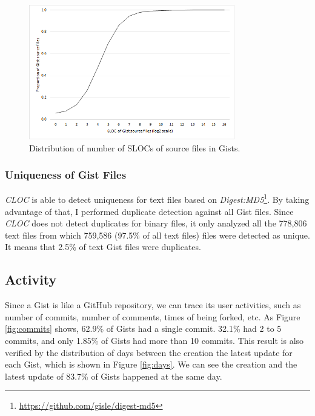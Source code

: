 \begin{figure}[!htb]
	\centering
	\includegraphics[width=0.8\textwidth]{figures/sloc.png}
	\caption{Distribution of number of SLOCs of source files in Gists.}
	\label{fig:sloc}
\end{figure}

\subsubsection{Uniqueness of Gist Files}
\textit{CLOC} is able to detect uniqueness for text files based on \textit{Digest:MD5}\footnote{\url{https://github.com/gisle/digest-md5}}. By taking advantage of that, I performed duplicate detection against all Gist files. Since \textit{CLOC} does not detect duplicates for binary files, it only analyzed all the 778,806 text files from which 759,586 (97.5\% of all text files) files were detected as unique. It means that 2.5\% of text Gist files were duplicates.

\subsection{Activity}
Since a Gist is like a GitHub repository, we can trace its user activities, such as number of commits, number of comments, times of being forked, etc. As Figure \ref{fig:commits} shows, 62.9\% of Gists had a single commit. 32.1\% had 2 to 5 commits, and only 1.85\% of Gists had more than 10 commits. This result is also verified by the distribution of days between the creation the latest update for each Gist, which is shown in Figure \ref{fig:days}. We can see the creation and the latest update of 83.7\% of Gists happened at the same day. 

